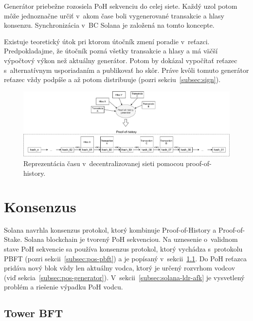 Generátor priebežne rozosiela PoH sekvenciu do celej siete. Každý uzol potom môže jednoznačne určiť v~akom čase boli vygenerované transakcie a hlasy konsenzu. Synchronizácia v~BC Solana je založená na tomto koncepte.

Existuje teoretický útok pri ktorom útočník zmení poradie v~reťazci. Predpokladajme, že útočník pozná všetky transakcie a hlasy a má väčší výpočtový výkon než aktuálny generátor. Potom by dokázal vypočítať reťazec s~alternatívnym usporiadaním a publikovať ho skôr. Práve kvôli tomuto generátor reťazec vždy podpíše a až potom distribuuje (pozri sekciu~\ref{subsec:sign}).

\begin{figure}[bt]
	\centering
	\includegraphics[width=\textwidth]{obrazky-figures/solana-poh-time}
	\caption{Reprezentácia času v~decentralizovanej sieti pomocou proof-of-history.}
	\label{img:solana-poh}
\end{figure}

\section{Konsenzus}\label{sec:solana-consens}

Solana navrhla konsenzus protokol, ktorý kombinuje Proof-of-History a Proof-of-Stake. Solana blockchain je tvorený PoH sekvenciou. Na uznesenie o~validnom stave PoH sekvencie sa používa konsenzus protokol, ktorý vychádza s~protokolu PBFT (pozri sekcii~\ref{subsec:pos-pbft}) a je popísaný v~sekcii~\ref{subsec:towerbft}. Do PoH reťazca pridáva nový blok vždy len aktuálny vodca, ktorý je určený rozvrhom vodcov (viď sekcia~\ref{subsec:pos-generator}). V~sekcii~\ref{subsec:solana-ldr-afk} je vysvetlený problém a riešenie výpadku PoH vodcu.

\subsection{Tower BFT}\label{subsec:towerbft}

